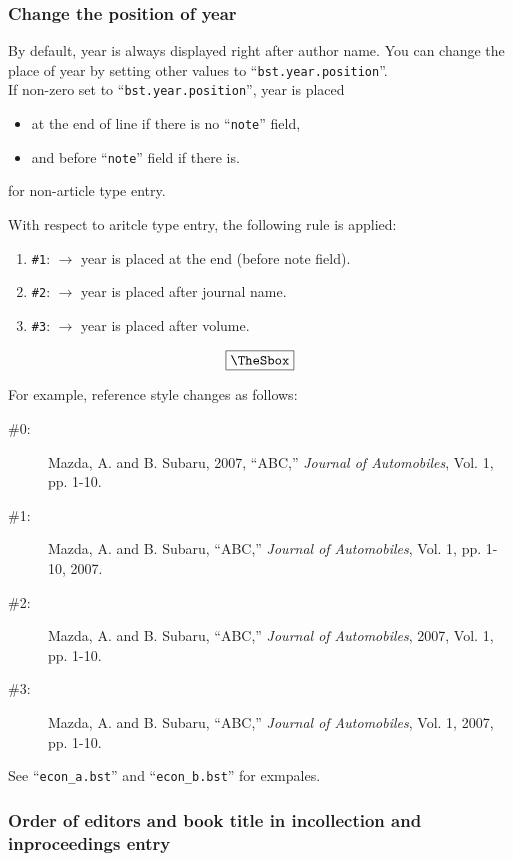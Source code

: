 \documentclass[10pt]{article}
\newenvironment{Frame}%
{\setlength{\fboxsep}{15pt}
\setlength{\mylength}{\linewidth}%
\addtolength{\mylength}{-2\fboxsep}%
\addtolength{\mylength}{-2\fboxrule}%
\Sbox
\minipage{\mylength}%
\setlength{\abovedisplayskip}{0pt}%
\setlength{\belowdisplayskip}{0pt}%
}%
{\endminipage\endSbox
\[\fbox{\TheSbox}\]}
\begin{document}
\subsubsection{Change the position of year}

By default, year is always displayed right after author name.  You can
change the place of year by setting other values to
``\texttt{bst.year.position}''.
\\

If non-zero set to ``\texttt{bst.year.position}'', year is placed
\begin{itemize}
 \item at the end of line if there is no ``\texttt{note}'' field, 
 \item and before ``\texttt{note}'' field if there is.
\end{itemize}
for non-article type entry.

With respect to aritcle type entry, the following rule is applied:
\begin{Frame}
\begin{enumerate}
 \item \verb|#1|: $\rightarrow$ year is placed at the end (before note field).
 \item \verb|#2|: $\rightarrow$ year is placed after journal name.
 \item \verb|#3|: $\rightarrow$ year is placed after volume.
\end{enumerate}
\end{Frame}

For example, reference style changes as follows:
\begin{description}
 \item[\#0: ] Mazda, A. and B. Subaru, 2007, ``ABC,'' \textit{Journal of Automobiles}, Vol. 1, pp. 1-10.
 \item[\#1: ] Mazda, A. and B. Subaru, ``ABC,'' \textit{Journal of Automobiles}, Vol. 1, pp. 1-10, 2007.
 \item[\#2: ] Mazda, A. and B. Subaru, ``ABC,'' \textit{Journal of Automobiles}, 2007, Vol. 1, pp. 1-10.
 \item[\#3: ] Mazda, A. and B. Subaru, ``ABC,'' \textit{Journal of Automobiles}, Vol. 1, 2007, pp. 1-10.
\end{description}

See ``\verb|econ_a.bst|'' and ``\verb|econ_b.bst|'' for exmpales.


\subsubsection{Order of editors and book title in incollection and inproceedings entry}
\end{document}
